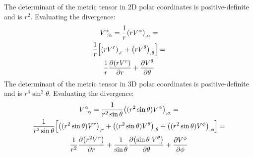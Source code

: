 \documentclass{report}
\theoremstyle{definition}
\begin{document}
\begin{chapter6}\label{prob: 6}
	
\end{chapter6}

\begin{chapter6}\label{prob: 7}
	
\end{chapter6}

\begin{chapter6}\label{prob: 8}
	\begin{subequations}
		
	\end{subequations}
\end{chapter6}

\begin{chapter6}\label{prob: 9}
	The determinant of the metric tensor in 2D polar coordinates is positive-definite and is $r^2$. Evaluating the divergence:
		\begin{gather}
			V^{\alpha}_{\;\;;\alpha} = \frac{1}{r}\pqty{rV^{\alpha}}_{,\alpha} = \\
			\frac{1}{r}\bqty{\pqty{rV^r}_{,r} + \pqty{rV^{\theta}}_{,\theta}} = \\
			\frac{1}{r}\pdv{\pqty{rV^r}}{r} + \pdv{V^{\theta}}{\theta}
		\end{gather}
		The determinant of the metric tensor in 3D polar coordinates is positive-definite and is $r^4\sin^2\theta$. Evaluating the divergence:
		\begin{gather}
			V^{\alpha}_{\;\;;\alpha} = \frac{1}{r^2\sin\theta}\pqty{(r^2\sin\theta)V^{\alpha}}_{,\alpha} = \\
			\frac{1}{r^2\sin\theta}\bqty{\pqty{(r^2\sin\theta)V^r}_{,r} + \pqty{(r^2\sin\theta)V^{\theta}}_{,\theta} + \pqty{(r^2\sin\theta)V^{\phi}}_{,\phi}} = \\
			\frac{1}{r^2}\pdv{\pqty{r^2V^r}}{r} + \frac{1}{\sin\theta}\pdv{\pqty{\sin\theta\;V^{\theta}}}{\theta} + \pdv{V^{\phi}}{\phi}
		\end{gather}
\end{chapter6}

\begin{chapter6}\label{prob: 10}
	
\end{chapter6}
\end{document}
